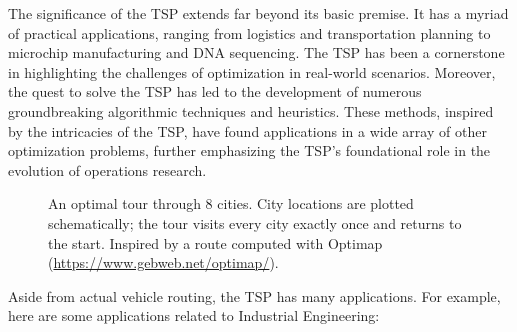 The significance of the TSP extends far beyond its basic premise. It has a myriad of practical applications, ranging from logistics and transportation planning to microchip manufacturing and DNA sequencing. The TSP has been a cornerstone in highlighting the challenges of optimization in real-world scenarios. Moreover, the quest to solve the TSP has led to the development of numerous groundbreaking algorithmic techniques and heuristics. These methods, inspired by the intricacies of the TSP, have found applications in a wide array of other optimization problems, further emphasizing the TSP's foundational role in the evolution of operations research.

\begin{figure}[H]
\centering
{}
\caption{An optimal tour through 8 cities.  City locations are plotted schematically; the tour visits every city exactly once and returns to the start.  Inspired by a route computed with Optimap (\url{https://www.gebweb.net/optimap/}).}
\end{figure}
Aside from actual vehicle routing, the TSP has many applications.  For example, here are some applications related to Industrial Engineering:

